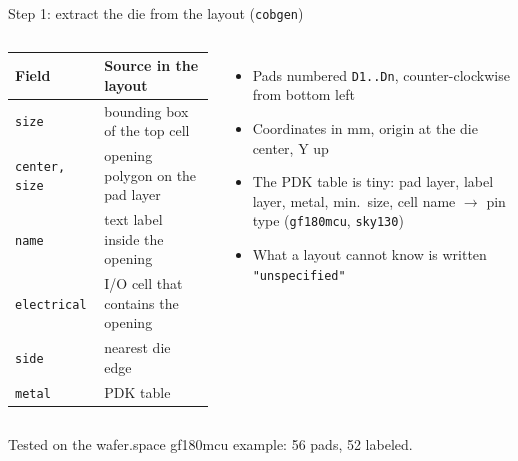 \documentclass[aspectratio=169,11pt]{beamer}
\begin{document}
\begin{frame}{Step 1: extract the die from the layout (\texttt{cobgen})}
  \footnotesize
  \begin{columns}[T]
      \begin{tabular}{@{}p{2.3cm}p{4.2cm}@{}}
        \toprule
        \textbf{Field} & \textbf{Source in the layout}\\
        \midrule
        \texttt{size} & bounding box of the top cell\\
        \texttt{center, size} & opening polygon on the pad layer\\
        \texttt{name} & text label inside the opening\\
        \texttt{electrical} & I/O cell that contains the opening\\
        \texttt{side} & nearest die edge\\
        \texttt{metal} & PDK table\\
        \bottomrule
      \end{tabular}
      \begin{itemize}\setlength\itemsep{0.25em}
        \item Pads numbered \texttt{D1..Dn}, counter-clockwise from bottom left
        \item Coordinates in mm, origin at the die center, Y up
        \item The PDK table is tiny: pad layer, label layer, metal, min.\ size, cell name $\to$ pin type (\texttt{gf180mcu}, \texttt{sky130})
        \item What a layout cannot know is written \texttt{"unspecified"}
      \end{itemize}
  \end{columns}
  \vfill
  {\scriptsize\color{cobgrey} Tested on the wafer.space gf180mcu example: 56 pads, 52 labeled.}
\end{frame}
\end{document}
